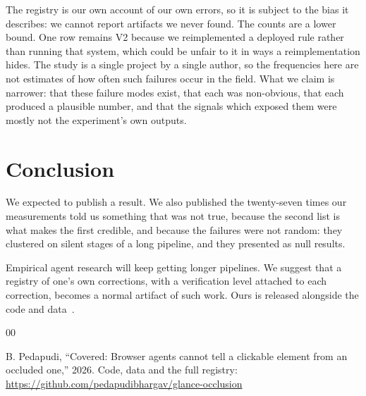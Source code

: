 \documentclass[conference]{IEEEtran}
\begin{document}
The registry is our own account of our own errors, so it is subject to the bias
it describes: we cannot report artifacts we never found. The counts are a lower
bound. One row remains V2 because we reimplemented a deployed rule rather than
running that system, which could be unfair to it in ways a reimplementation
hides. The study is a single project by a single author, so the frequencies here
are not estimates of how often such failures occur in the field. What we claim
is narrower: that these failure modes exist, that each was non-obvious, that
each produced a plausible number, and that the signals which exposed them were
mostly not the experiment's own outputs.

\section{Conclusion}

We expected to publish a result. We also published the twenty-seven times our
measurements told us something that was not true, because the second list is
what makes the first credible, and because the failures were not random: they
clustered on silent stages of a long pipeline, and they presented as null
results.

Empirical agent research will keep getting longer pipelines. We suggest that a
registry of one's own corrections, with a verification level attached to each
correction, becomes a normal artifact of such work. Ours is released alongside
the code and data~\cite{covered}.

\begin{thebibliography}{00}

B. Pedapudi, ``Covered: Browser agents cannot tell a clickable element from an
occluded one,'' 2026. Code, data and the full registry:
\url{https://github.com/pedapudibhargav/glance-occlusion}

\end{thebibliography}
\end{document}

